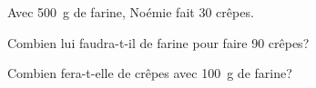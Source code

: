 Avec 500~g de farine, Noémie fait 30 crêpes.
\begin{myenumerate}
	\item Combien lui faudra-t-il de farine pour faire 90 crêpes?
	\item Combien fera-t-elle de crêpes avec 100~g de farine?
\end{myenumerate}